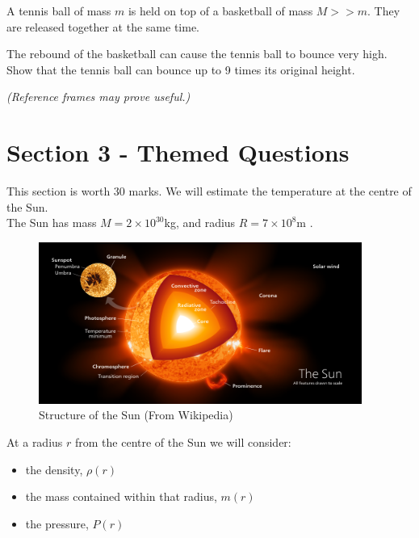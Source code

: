 \documentclass{exam}
\begin{document}
\begin{questions}

    \question[7]
    A tennis ball of mass $m$ is held on top of a basketball of mass $M >> m$. They are released together at the same time.

    The rebound of the basketball can cause the tennis ball to bounce very high. Show that the tennis ball can bounce up to 9 times its original height.

    \textit{(Reference frames may prove useful.)}

\end{questions}



\newpage
\section*{Section 3 - Themed Questions}
This section is worth 30 marks. We will estimate the temperature at the centre of the Sun.\\
The Sun has mass $M = 2 \times 10^{30}$kg, and radius $R = 7 \times 10^8$m .
\begin{figure}[h]
    \centering
    \includegraphics[height=150pt]{sunstructure}
    \caption{Structure of the Sun (From Wikipedia)}
\end{figure}

\raggedright
At a radius $r$ from the centre of the Sun we will consider:
\begin{itemize}
    \item the density, $\rho(r)$
    \item the mass contained within that radius, $m(r)$
    \item the pressure, $P(r)$
\end{itemize}
\end{document}
